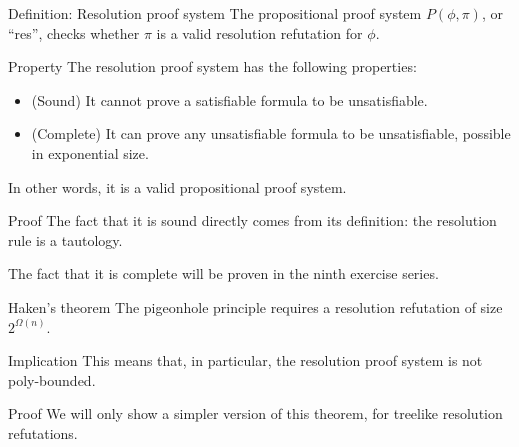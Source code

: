 \documentclass[a4paper]{article}
\begin{document}
\begin{parag}{Definition: Resolution proof system}
    The  propositional proof system $P\left(\phi, \pi\right)$, or ``res'', checks whether $\pi$ is a valid resolution refutation for $\phi$.
\end{parag}

\begin{parag}{Property}
    The resolution proof system has the following properties:
    \begin{itemize}[left=0pt]
        \item (Sound) It cannot prove a satisfiable formula to be unsatisfiable.
        \item (Complete) It can prove any unsatisfiable formula to be unsatisfiable, possible in exponential size.
    \end{itemize}

    In other words, it is a valid propositional proof system.

    \begin{subparag}{Proof}
        The fact that it is sound directly comes from its definition: the resolution rule is a tautology.

        The fact that it is complete will be proven in the ninth exercise series.
    \end{subparag}
\end{parag}

\begin{parag}{Haken's theorem}
    The pigeonhole principle requires a resolution refutation of size $2^{\Omega\left(n\right)}$.

    \begin{subparag}{Implication}
        This means that, in particular, the resolution proof system is not poly-bounded.
    \end{subparag}

    \begin{subparag}{Proof}
        We will only show a simpler version of this theorem, for treelike resolution refutations.
    \end{subparag}
\end{parag}
\end{document}

